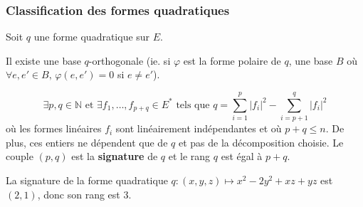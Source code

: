   \subsubsection{Classification des formes quadratiques}
  
  
  Soit $q$ une forme quadratique sur $E$.
  
  \begin{lemma}
    Il existe une base $q$-orthogonale (ie. si $\varphi$ est la forme polaire de $q$, une base $B$ où $\forall e, e' \in B, \, \varphi(e, e') = 0$ si $e \neq e'$).
  \end{lemma}
  
  
  \begin{theorem}
    \[ \exists p, q \in \mathbb{N} \text{ et } \exists f_1, \dots, f_{p+q} \in E^* \text{ tels que } q = \sum_{i=1}^p |f_i|^2 - \sum_{i=p+1}^q |f_i|^2 \]
    où les formes linéaires $f_i$ sont linéairement indépendantes et où $p + q \leq n$. De plus, ces entiers ne dépendent que de $q$ et pas de la décomposition choisie.
    \newpar
    Le couple $(p,q)$ est la \textbf{signature} de $q$ et le rang $q$ est égal à $p+q$.
  \end{theorem}
  
  \begin{example}
    La signature de la forme quadratique $q : (x,y,z) \mapsto x^2 - 2y^2 + xz + yz$ est $(2,1)$, donc son rang est $3$.
  \end{example}

